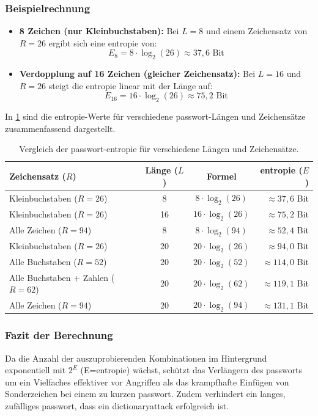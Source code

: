 \documentclass[12pt,a4paper]{article}
\begin{document}
\subsubsection{Beispielrechnung}
\begin{itemize}
    \item \textbf{8 Zeichen (nur Kleinbuchstaben):} Bei $L = 8$ und einem Zeichensatz von $R = 26$ ergibt sich eine \gls{entropie} von:
    \[
    E_8 = 8 \cdot \log_2(26) \approx 37{,}6 \text{ Bit}
    \]
    \item \textbf{Verdopplung auf 16 Zeichen (gleicher Zeichensatz):} Bei $L = 16$ und $R = 26$ steigt die \gls{entropie} linear mit der Länge auf:
    \[
    E_{16} = 16 \cdot \log_2(26) \approx 75{,}2 \text{ Bit}
    \]
\end{itemize}

In \cref{tab:entropie_vergleich} sind die \gls{entropie}-Werte für verschiedene \gls{passwort}-Längen und Zeichensätze zusammenfassend dargestellt.

\begin{table}[htbp]
    \centering
    \begin{tabular}{|l|c|c|r|}
        \hline
        \textbf{Zeichensatz ($R$)} & \textbf{Länge ($L$)} & \textbf{Formel} & \textbf{\gls{entropie} ($E$)} \\
        \hline
        Kleinbuchstaben ($R=26$) & 8 & $8 \cdot \log_2(26)$ & $\approx 37{,}6$ Bit \\
        Kleinbuchstaben ($R=26$) & 16 & $16 \cdot \log_2(26)$ & $\approx 75{,}2$ Bit \\
        Alle Zeichen ($R=94$) & 8 & $8 \cdot \log_2(94)$ & $\approx 52{,}4$ Bit \\
        Kleinbuchstaben ($R=26$) & 20 & $20 \cdot \log_2(26)$ & $\approx 94{,}0$ Bit \\
        Alle Buchstaben ($R=52$) & 20 & $20 \cdot \log_2(52)$ & $\approx 114{,}0$ Bit \\
        Alle Buchstaben + Zahlen ($R=62$) & 20 & $20 \cdot \log_2(62)$ & $\approx 119{,}1$ Bit \\
        Alle Zeichen ($R=94$) & 20 & $20 \cdot \log_2(94)$ & $\approx 131{,}1$ Bit \\
        \hline
    \end{tabular}
    \caption{Vergleich der \gls{passwort}-\gls{entropie} für verschiedene Längen und Zeichensätze.}
    \label{tab:entropie_vergleich}
\end{table}

\subsubsection{Fazit der Berechnung}
Da die Anzahl der auszuprobierenden Kombinationen im Hintergrund exponentiell mit $2^E$ (E=\gls{entropie}) wächst, schützt das Verlängern des \gls{passwort}s um ein Vielfaches effektiver vor Angriffen als das krampfhafte Einfügen von Sonderzeichen bei einem zu kurzen \gls{passwort}. Zudem verhindert ein langes, zufälliges \gls{passwort}, dass ein \gls{dictionaryattack} erfolgreich ist.
\end{document}
